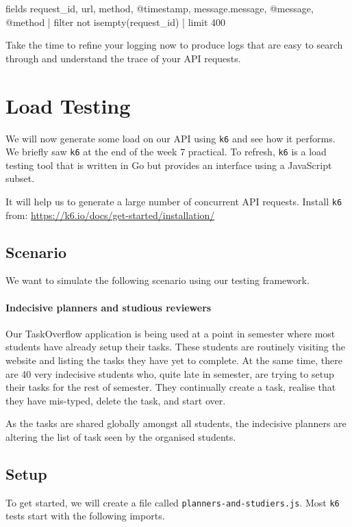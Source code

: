 \documentclass{csse4400}
\begin{document}
\begin{code}[numbers=none]{}
fields request_id, url, method, @timestamp, message.message, @message, @method
| filter not isempty(request_id)
| limit 400
\end{code}

Take the time to refine your logging now to produce logs that are easy to search through
and understand the trace of your API requests.


\section{Load Testing}

We will now generate some load on our API using \texttt{k6} and see how it performs.
We briefly saw \texttt{k6} at the end of the week 7 practical.
To refresh, \texttt{k6} is a load testing tool that is written in Go but provides an interface using a JavaScript subset.

It will help us to generate a large number of concurrent API requests.
Install \texttt{k6} from:
\url{https://k6.io/docs/get-started/installation/}

\subsection{Scenario}
We want to simulate the following scenario using our testing framework.

\paragraph{Indecisive planners and studious reviewers}
Our TaskOverflow application is being used at a point in semester where most students have already setup their tasks.
These students are routinely visiting the website and listing the tasks they have yet to complete.
At the same time, there are 40 very indecisive students who,
quite late in semester,
are trying to setup their tasks for the rest of semester.
They continually create a task,
realise that they have mis-typed,
delete the task,
and start over.

As the tasks are shared globally amongst all students,
the indecisive planners are altering the list of task seen by the organised students.

\subsection{Setup}
To get started,
we will create a file called \texttt{planners-and-studiers.js}.
Most \texttt{k6} tests start with the following imports.
\end{document}
